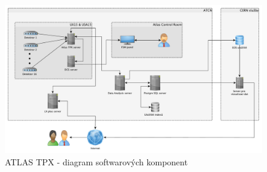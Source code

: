 \begin{figure}[th]
	\begin{center}
		\includegraphics[width=16cm]{figures/atlas_tpx_sw_diagram.pdf}
		\caption{ATLAS TPX - diagram softwarových komponent}
		\label{fig:tpx_sw_diagram}
	\end{center}
\end{figure}


